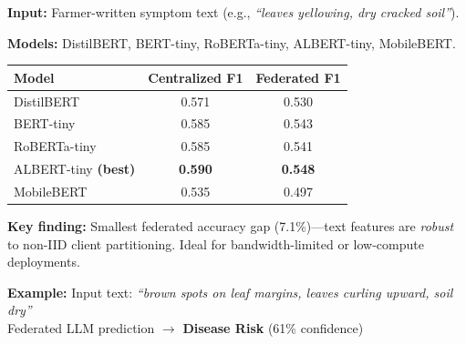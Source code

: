 \documentclass[11pt,a4paper]{article}
\begin{document}
\begin{paradigmbox}[linecolor=llmblue]
\noindent{\large\bfseries\textcolor{llmblue}{Paradigm 1 --- Federated LLM}}
\smallskip

\noindent\textbf{Input:} Farmer-written symptom text
(e.g., \textit{``leaves yellowing, dry cracked soil''}).

\noindent\textbf{Models:} DistilBERT, BERT-tiny, RoBERTa-tiny, ALBERT-tiny, MobileBERT.

\smallskip
\begin{center}
\renewcommand{\arraystretch}{1.3}
\begin{tabular}{lcc}
\toprule
\textbf{Model} & \textbf{Centralized F1} & \textbf{Federated F1} \\
\midrule
DistilBERT    & 0.571 & 0.530 \\
BERT-tiny     & 0.585 & 0.543 \\
RoBERTa-tiny  & 0.585 & 0.541 \\
\rowcolor{llmlight}
ALBERT-tiny \textbf{(best)} & \textbf{0.590} & \textbf{0.548} \\
MobileBERT    & 0.535 & 0.497 \\
\bottomrule
\end{tabular}
\end{center}

\noindent\textbf{Key finding:} Smallest federated accuracy gap (7.1\%)---text features
are \emph{robust} to non-IID client partitioning.
Ideal for bandwidth-limited or low-compute deployments.

\begin{examplebox}
\textbf{Example:}\enspace
Input text: \textit{``brown spots on leaf margins, leaves curling upward, soil dry''} \\
Federated LLM prediction $\to$ \textbf{Disease Risk} \hfill (61\% confidence)
\end{examplebox}
\end{paradigmbox}
\end{document}
